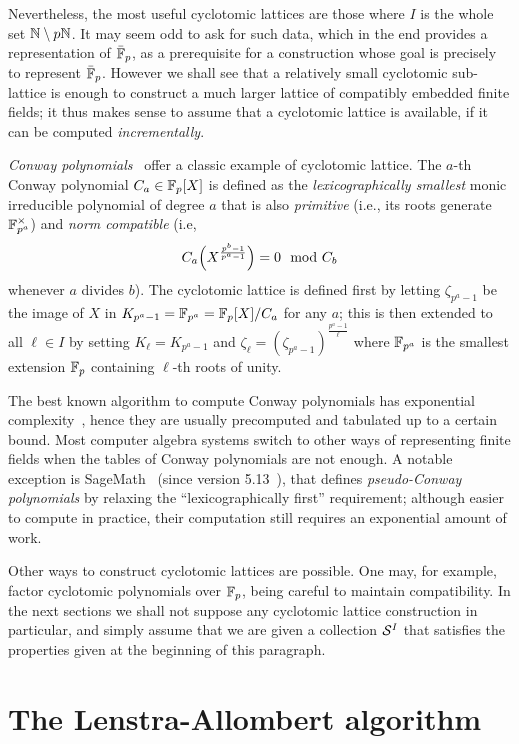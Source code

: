\documentclass[sigconf]{acmart}
\begin{document}
Nevertheless, the most useful cyclotomic lattices are those where $I$
is the whole set $\mathbb{N}\setminus p\mathbb{N}$.
It may seem odd to ask for such data, which in the end provides a representation of $\bar{\mathbb{F}}_p$,
as a prerequisite for a construction whose goal is precisely to represent $\bar{\mathbb{F}}_p$.
However we shall see that a relatively small cyclotomic sub-lattice is
enough to construct a much larger lattice of compatibly embedded
finite fields; it thus makes sense to assume that a cyclotomic lattice
is available, if it can be computed \emph{incrementally}.

\emph{Conway polynomials}~\cite{Nickel1988} offer a classic example of
cyclotomic lattice. %
The $a$-th Conway polynomial $C_a\in\mathbb{F}_p[X]$ is defined as the
\emph{lexicographically smallest} monic irreducible polynomial of
degree $a$ that is also \emph{primitive} (i.e., its roots generate
$\mathbb{F}_{p^a}^\times$) and \emph{norm compatible} (i.e,
$$C_a\Bigl(X^{\frac{p^b-1}{p^a-1}}\Bigr) = 0 \mod C_b$$
whenever $a$ divides $b$). %
The cyclotomic lattice is defined first by letting $\zeta_{p^a-1}$ be the
image of $X$ in $K_{p^a-1}=\mathbb{F}_{p^a}=\mathbb{F}_p[X]/C_a$ for any $a$;
this is then extended to all $\ell\in I$ by setting $K_\ell=K_{p^a-1}$
and $\zeta_\ell=(\zeta_{p^a-1})^{\frac{p^a-1}{\ell}}$
where $\mathbb{F}_{p^a}$ is the smallest extension $\mathbb{F}_p$ containing $\ell$-th roots of unity.

The best known algorithm to compute Conway polynomials has exponential
complexity~\cite{heath+loehr99}, hence they are usually precomputed
and tabulated up to a certain bound. %
Most computer algebra systems switch to other ways of representing
finite fields when the tables of Conway polynomials are not enough. %
A notable exception is SageMath~\cite{Sage} (since version
5.13~\cite{Roe2013}), that defines \emph{pseudo-Conway polynomials} by
relaxing the ``lexicographically first'' requirement; although
easier to compute in practice, their computation still requires an
exponential amount of work.

Other ways to construct cyclotomic lattices are possible. %
One may, for example, factor cyclotomic polynomials over $\mathbb{F}_p$, being
careful to maintain compatibility. %
In the next sections we shall not suppose any cyclotomic lattice
construction in particular, and simply assume that we are given a
collection $\mathcal{S}^{I}$ that satisfies the properties given at the
beginning of this paragraph.

\section{The Lenstra-Allombert algorithm}
\label{sec:lenstra}
\end{document}
